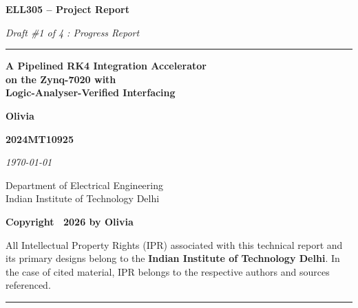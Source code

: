 \begin{titlepage}
\centering
\vspace*{\fill}
{\sffamily\bfseries\Huge ELL305 -- Project Report\par}
\vspace{3mm}
{\large\itshape Draft \#1 of 4 : Progress Report\par}
\vspace{4mm}
\textcolor{lipicsyellow}{\rule{0.35\linewidth}{1.2mm}}\par
\vspace{6mm}
{\sffamily\bfseries\Large A Pipelined RK4 Integration Accelerator\\
on the Zynq-7020 with\\
Logic-Analyser-Verified Interfacing\par}
\vspace{10mm}
{\sffamily\bfseries\LARGE Olivia\par}
\vspace{2mm}
{\large\bfseries 2024MT10925\par}
\vspace{2mm}
{\large\itshape \today\par}
\vspace{10mm}
{\large Department of Electrical Engineering\\
Indian Institute of Technology Delhi\par}
\vspace*{\fill}
\end{titlepage}

\thispagestyle{empty}
\vspace*{\fill}
\begin{center}
  {\sffamily\bfseries\large Copyright \textcopyright\ 2026 by Olivia\par}
  \vspace{1.2em}
  \begin{minipage}{0.78\linewidth}
    \centering
    All Intellectual Property Rights (IPR) associated with this technical report and its
    primary designs belong to the \textbf{Indian Institute of Technology Delhi}.
    In the case of cited material, IPR belongs to the respective authors and sources referenced.
  \end{minipage}
  \vspace{2.5em}

  \textcolor{lipicsyellow}{\rule{0.25\linewidth}{1.2mm}}
\end{center}
\vspace*{\fill}
\newpage

